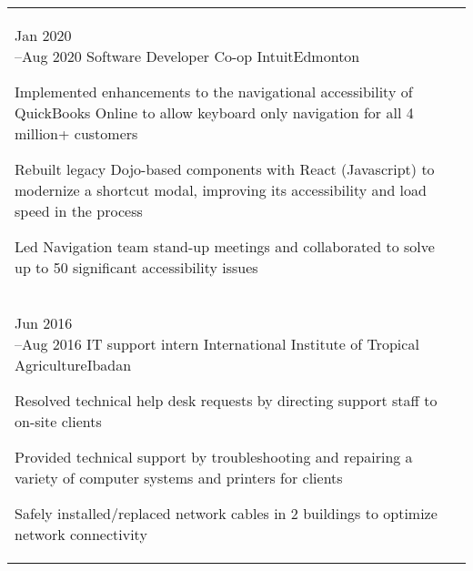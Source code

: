 

\section*{}

\begin{tabular}{@{\raggedright}p{} |>{\raggedright\arraybackslash}p{}}
    
    \cvevent{Jan 2020\newline --Aug 2020}
    {Software Developer Co-op}
    {Intuit}{Edmonton}
    {\begin{tabitemize}
        \item Implemented enhancements to the navigational accessibility of QuickBooks Online to allow keyboard only navigation for all 4 million+ customers
        \item Rebuilt legacy Dojo-based components with React (Javascript) to modernize a shortcut modal, improving its accessibility and load speed in the process
        \item Led Navigation team stand-up meetings and collaborated to solve up to 50 significant accessibility issues
    \end{tabitemize}
    } \\

    \cvevent{Jun 2016\newline --Aug 2016}
    {IT support intern}
    {International Institute of Tropical Agriculture}{Ibadan}
    {\begin{tabitemize}
        \item Resolved technical help desk requests by directing support staff to on-site clients
        \item Provided technical support by troubleshooting and repairing a variety of computer systems and printers for clients
        \item Safely installed/replaced network cables in 2 buildings to optimize network connectivity
    \end{tabitemize}
    \vspace{-\baselineskip}\mbox{}
    }

\end{tabular}
